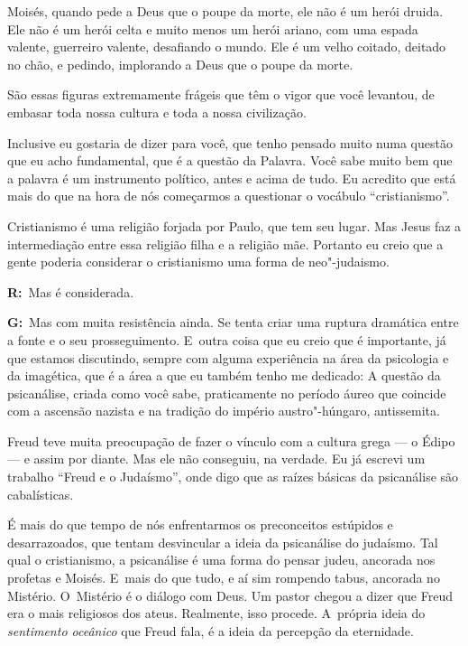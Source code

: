  

Moisés, quando pede a Deus que o poupe da morte, ele não é um herói
druida. Ele não é um herói celta e muito menos um herói ariano, com uma
espada valente, guerreiro valente, desafiando o mundo. Ele é um velho
coitado, deitado no chão, e pedindo, implorando a Deus que o poupe da
morte.

 

São essas figuras extremamente frágeis que têm o vigor que você
levantou, de embasar toda nossa cultura e toda a nossa civilização.

 

Inclusive eu gostaria de dizer para você, que tenho pensado muito numa
questão que eu acho fundamental, que é a questão da Palavra. Você sabe
muito bem que a palavra é um instrumento político, antes e acima de
tudo. Eu acredito que está mais do que na hora de nós começarmos a
questionar o vocábulo ``cristianismo''.

 

Cristianismo é uma religião forjada por Paulo, que tem seu lugar. Mas
Jesus faz a intermediação entre essa religião filha e a religião mãe.
Portanto eu creio que a gente poderia considerar o cristianismo uma
forma de neo"-judaismo.

 

\textbf{R:}~Mas é considerada.

 

\textbf{G:}~Mas com muita resistência ainda. Se tenta criar uma ruptura
dramática entre a fonte e o seu prosseguimento. E~outra coisa que eu
creio que é importante, já que estamos discutindo, sempre com alguma
experiência na área da psicologia e da imagética, que é a área a que eu
também tenho me dedicado: A questão da psicanálise, criada como você
sabe, praticamente no período áureo que coincide com a ascensão nazista
e na tradição do império austro"-húngaro, antissemita.

 

Freud teve muita preocupação de fazer o vínculo com a cultura grega ---
o Édipo --- e assim por diante. Mas ele não conseguiu, na verdade. Eu já
escrevi um trabalho ``Freud e o Judaísmo'', onde digo que as raízes
básicas da psicanálise são cabalísticas.

 

É mais do que tempo de nós enfrentarmos os preconceitos estúpidos e
desarrazoados, que tentam desvincular a ideia da psicanálise do
judaísmo. Tal qual o cristianismo, a psicanálise é uma forma do pensar
judeu, ancorada nos profetas e Moisés. E~mais do que tudo, e aí sim
rompendo tabus, ancorada no Mistério. O~Mistério é o diálogo com Deus.
Um pastor chegou a dizer que Freud era o mais religiosos dos ateus.
Realmente, isso procede. A~própria ideia do \emph{sentimento oceânico}
que Freud fala, é a ideia da percepção da eternidade.

